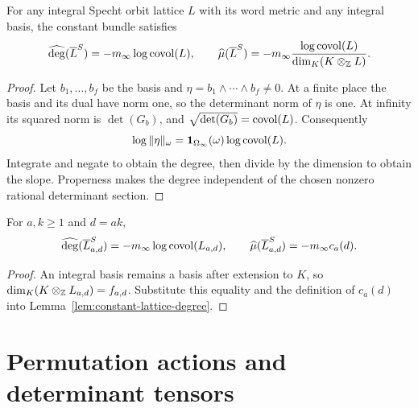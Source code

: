 \begin{lemma}
\label{lem:constant-lattice-degree}
\leanok
For any integral Specht orbit lattice $L$ with its word metric and any
integral basis, the constant bundle satisfies
\[
 \widehat{\deg}(\overline L^S)=-m_\infty\log\operatorname{covol}(L),\qquad
 \widehat\mu(\overline L^S)=
   -m_\infty\frac{\log\operatorname{covol}(L)}{\dim_K(K\otimes_\mathbb Z L)}.
\]
\end{lemma}
\begin{proof}
Let $b_1,\ldots,b_f$ be the basis and
$\eta=b_1\wedge\cdots\wedge b_f\ne0$. At a finite place the basis and its
dual have norm one, so the determinant norm of $\eta$ is one. At infinity
its squared norm is $\det(G_b)$, and
$\sqrt{\det(G_b)}=\operatorname{covol}(L)$. Consequently
\[
 \log\|\eta\|_\omega
 =\mathbf1_{\Omega_\infty}(\omega)\log\operatorname{covol}(L).
\]
Integrate and negate to obtain the degree, then divide by the dimension
to obtain the slope. Properness makes the degree independent of the
chosen nonzero rational determinant section.
\end{proof}

\begin{lemma}
\label{lem:specht-degree}
\leanok
For $a,k\ge1$ and $d=ak$,
\[
 \widehat{\deg}(\overline L^S_{a,d})
      =-m_\infty\log\operatorname{covol}(L_{a,d}),\qquad
 \widehat\mu(\overline L^S_{a,d})=-m_\infty c_a(d).
\]
\end{lemma}
\begin{proof}
An integral basis remains a basis after extension to $K$, so
$\dim_K(K\otimes_\mathbb Z L_{a,d})=f_{a,d}$. Substitute this equality and the
definition of $c_a(d)$ into Lemma~\ref{lem:constant-lattice-degree}.
\end{proof}

\section{Permutation actions and determinant tensors}

